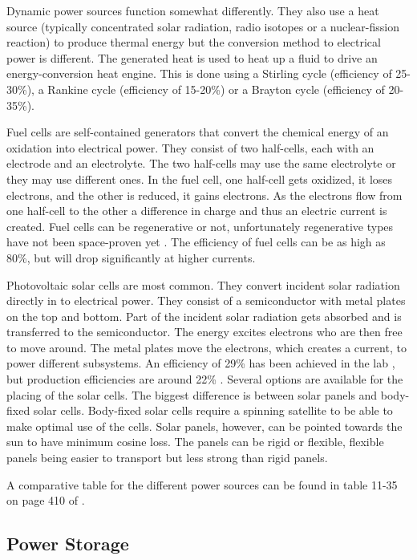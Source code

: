 Dynamic power sources function somewhat differently. They also use a heat source (typically concentrated solar radiation, radio isotopes or a nuclear-fission reaction) to produce thermal energy but the conversion method to electrical power is different. The generated heat is used to heat up a fluid to drive an energy-conversion heat engine. This is done using a Stirling cycle (efficiency of 25-30\%), a Rankine cycle (efficiency of 15-20\%) or a Brayton cycle (efficiency of 20-35\%).

Fuel cells are self-contained generators that convert the chemical energy of an oxidation into electrical power. They consist of two half-cells, each with an electrode and an electrolyte. The two half-cells may use the same electrolyte or they may use different ones.
In the fuel cell, one half-cell gets oxidized, it loses electrons, and the other is reduced, it gains electrons. As the electrons flow from
one half-cell to the other a difference in charge and thus an electric current is created. Fuel cells can be regenerative or not, unfortunately regenerative types have not been space-proven yet \cite{rees}.
The efficiency of fuel cells can be as high as 80\%, but will drop significantly at higher currents.

Photovoltaic solar cells are most common. They convert incident solar radiation directly in to electrical power. They consist of a semiconductor with metal plates on the top and bottom. Part of the incident solar radiation gets absorbed and is transferred to the
semiconductor. The energy excites electrons who are then free to move around. The metal plates move the electrons, which creates a current,
to power different subsystems. An efficiency of 29\% has been achieved in the lab \cite{doody1}, but production efficiencies are around 22\% \cite{larson}. Several options are available for the placing of the solar cells. The biggest difference is between solar panels and body-fixed solar cells. Body-fixed solar cells require a spinning satellite to be able to make optimal use of the cells. Solar panels, however, can be pointed towards the sun to have minimum cosine loss. The panels can be rigid or flexible, flexible panels being easier to transport but less strong than rigid panels.

A comparative table for the different power sources can be found in table 11-35 on page 410 of \cite{larson}.

\subsection{Power Storage}
\label{blDOstorage}

